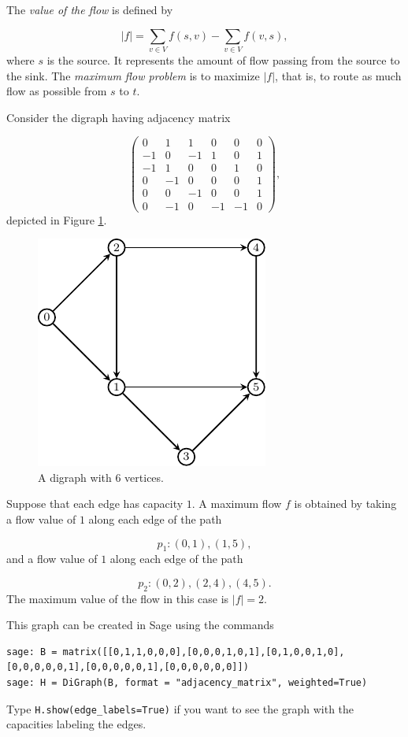 The {\it value of the flow} is defined by

\[
| f | = \sum_{v\in V}f(s,v)-\sum_{v\in V}f(v,s),
\]
where $s$ is the source.
It represents the amount of flow passing from the source to the sink.
The {\it maximum flow problem} is to maximize $| f |$, that is, to route as
much flow as possible from $s$ to $t$.

\begin{example}
{\rm
Consider the digraph having adjacency matrix

\[
\left(\begin{array}{cccccc}
0 & 1 & 1 & 0 & 0 & 0 \\
-1 & 0 & -1 & 1 & 0 & 1 \\
-1 & 1 & 0 & 0 & 1 & 0 \\
0 & -1 & 0 & 0 & 0 & 1 \\
0 & 0 & -1 & 0 & 0 & 1 \\
0 & -1 & 0 & -1 & -1 & 0
\end{array}\right),
\]
depicted in Figure \ref{fig:network_flows:digraph_flow}.

\begin{figure}[!htbp]
\centering
\includegraphics{image/network-flows/digraph-flow}
\caption{A digraph with $6$ vertices.}
\label{fig:network_flows:digraph_flow}
\end{figure}
Suppose that each edge has capacity $1$.
A maximum flow $f$ is obtained by taking a flow value
of $1$ along each edge of the path

\[
p_1:(0,1),(1,5),
\]
and a flow value
of $1$ along each edge of the path

\[
p_2:(0,2),(2,4),(4,5).
\]
The maximum value of the flow in this case is $|f|=2$.

This graph can be created in Sage using the commands

\begin{lstlisting}
sage: B = matrix([[0,1,1,0,0,0],[0,0,0,1,0,1],[0,1,0,0,1,0],[0,0,0,0,0,1],[0,0,0,0,0,1],[0,0,0,0,0,0]])
sage: H = DiGraph(B, format = "adjacency_matrix", weighted=True)
\end{lstlisting}

\noindent
Type {\tt H.show(edge\_labels=True)} if you want to see the graph with
the capacities labeling the edges.


}
\end{example}


